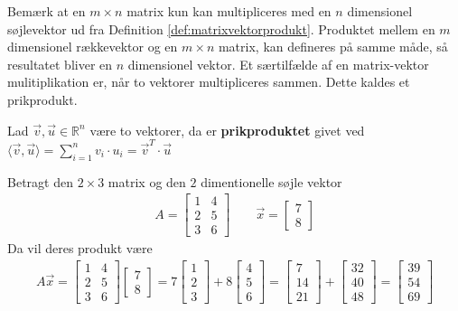 Bemærk at en $m \times n$ matrix kun kan multipliceres med en $n$ dimensionel søjlevektor ud fra Definition \ref{def:matrixvektorprodukt}. Produktet mellem en $m$ dimensionel rækkevektor og en $m \times n$ matrix, kan defineres på samme måde, så resultatet bliver en $n$ dimensionel vektor. 
Et særtilfælde af en matrix-vektor mulitiplikation er, når to vektorer multipliceres sammen. Dette kaldes et prikprodukt.
\begin{defn}[Prikproduktet]
Lad $\vec{v}, \vec{u} \in \mathds{R}^n$ være to vektorer, da er \textbf{prikproduktet} givet ved $\langle\vec{v},\vec{u}\rangle = \sum_{i=1}^n v_i \cdot u_i = \vec{v}^T \cdot \vec{u} $
\end{defn}
\begin{eks}
Betragt den $2 \times 3$ matrix og den $2$ dimentionelle søjle vektor
\begin{align*}
A=
\begin{bmatrix}
1 & 4\\
2 & 5\\
3 & 6
\end{bmatrix}
\qquad
\vec{x}=
\begin{bmatrix}
7\\
8
\end{bmatrix}
\end{align*}
Da vil deres produkt være
\begin{align*}
A\vec{x}= \begin{bmatrix}
1 & 4\\
2 & 5\\
3 & 6
\end{bmatrix}
\begin{bmatrix}
7\\
8
\end{bmatrix}
=
7
\begin{bmatrix}
1\\
2\\
3
\end{bmatrix}
+ 8
\begin{bmatrix}
4\\
5\\
6
\end{bmatrix}=
\begin{bmatrix}
7\\
14\\
21
\end{bmatrix}
+
\begin{bmatrix}
32\\
40\\
48
\end{bmatrix}
=
\begin{bmatrix}
39\\
54\\
69
\end{bmatrix}
\end{align*}
\end{eks}

